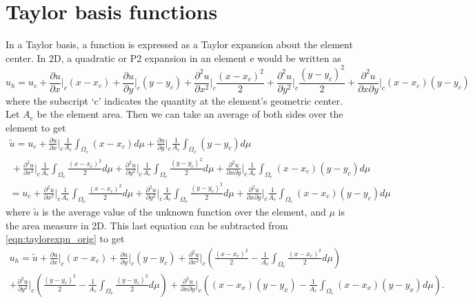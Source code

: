 \documentclass[11pt]{article}
\begin{document}
\section{Taylor basis functions}
In a Taylor basis, a function is expressed as a Taylor expansion about the element center. In 2D, a quadratic or P2 expansion in an element e would be written as
\begin{equation}
u_h = u_c + \frac{\partial u}{\partial x} \Big|_c(x-x_c) + \frac{\partial u}{\partial y} \Big|_c(y-y_c) + \frac{\partial^2 u}{\partial x^2} \Big|_c \frac{(x-x_c)^2}{2} + \frac{\partial^2 u}{\partial y^2} \Big|_c \frac{(y-y_c)^2}{2} + \frac{\partial^2 u}{\partial x\partial y} \Big|_c (x-x_c)(y-y_c)
\label{eqn:taylorexpn_orig}
\end{equation}
where the subscript `c' indicates the quantity at the element's geometric center. Let $A_e$ be the element area. Then we can take an average of both sides over the element to get
\begin{multline}
\tilde{u} = u_c + \frac{\partial u}{\partial x} \Big|_c \frac{1}{A_e}\int_{\Omega_e}(x-x_c)d\mu + \frac{\partial u}{\partial y} \Big|_c \frac{1}{A_e}\int_{\Omega_e} (y-y_c)d\mu \\ \, + \frac{\partial^2 u}{\partial x^2} \Big|_c \frac{1}{A_e}\int_{\Omega_e} \frac{(x-x_c)^2}{2}d\mu + \frac{\partial^2 u}{\partial y^2} \Big|_c \frac{1}{A_e}\int_{\Omega_e} \frac{(y-y_c)^2}{2}d\mu + \frac{\partial^2 u}{\partial x\partial y} \Big|_c \frac{1}{A_e}\int_{\Omega_e} (x-x_c)(y-y_c)d\mu \\
= u_c + \frac{\partial^2 u}{\partial x^2} \Big|_c \frac{1}{A_e}\int_{\Omega_e} \frac{(x-x_c)^2}{2}d\mu + \frac{\partial^2 u}{\partial y^2} \Big|_c \frac{1}{A_e}\int_{\Omega_e} \frac{(y-y_c)^2}{2}d\mu + \frac{\partial^2 u}{\partial x\partial y} \Big|_c \frac{1}{A_e}\int_{\Omega_e} (x-x_c)(y-y_c)d\mu
\end{multline}
where $\tilde{u}$ is the average value of the unknown function over the element, and $\mu$ is the area measure in 2D. This last equation can be subtracted from \eqref{eqn:taylorexpn_orig} to get
\begin{multline}
u_h = \tilde{u} + \frac{\partial u}{\partial x} \Big|_c(x-x_c) + \frac{\partial u}{\partial y} \Big|_c(y-y_c) + \frac{\partial^2 u}{\partial x^2} \Big|_c \left( \frac{(x-x_c)^2}{2} - \frac{1}{A_e}\int_{\Omega_e} \frac{(x-x_c)^2}{2}d\mu \right) \\ + \frac{\partial^2 u}{\partial y^2} \Big|_c \left( \frac{(y-y_c)^2}{2} -\frac{1}{A_e}\int_{\Omega_e} \frac{(y-y_c)^2}{2}d\mu \right) + \frac{\partial^2 u}{\partial x\partial y} \Big|_c \left( (x-x_x)(y-y_x) - \frac{1}{A_e}\int_{\Omega_e} (x-x_x)(y-y_x)d\mu \right).
\label{eqn:taylorexpn}
\end{multline}
\end{document}
